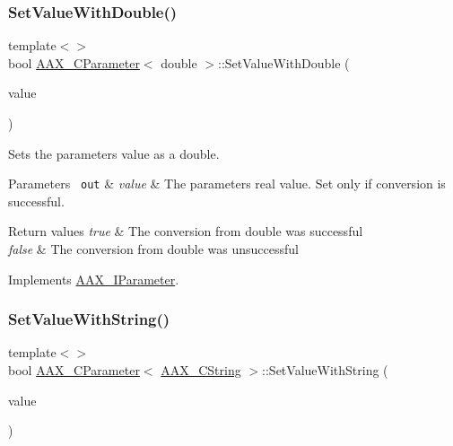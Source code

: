 \subsubsection{\texorpdfstring{SetValueWithDouble()}{SetValueWithDouble()}\hspace{0.1cm}{\footnotesize\ttfamily [2/2]}}
{\footnotesize\ttfamily template$<$$>$ \\
bool \mbox{\hyperlink{a01537}{A\+A\+X\+\_\+\+C\+Parameter}}$<$ double $>$\+::Set\+Value\+With\+Double (\begin{DoxyParamCaption}\item[{double}]{value }\end{DoxyParamCaption})\hspace{0.3cm}{\ttfamily [virtual]}}



Sets the parameter\textquotesingle{}s value as a double. 


\begin{DoxyParams}[1]{Parameters}
\mbox{\texttt{ out}}  & {\em value} & The parameter\textquotesingle{}s real value. Set only if conversion is successful.\\
\hline
\end{DoxyParams}

\begin{DoxyRetVals}{Return values}
{\em true} & The conversion from double was successful \\
\hline
{\em false} & The conversion from double was unsuccessful \\
\hline
\end{DoxyRetVals}


Implements \mbox{\hyperlink{a01857_a95e2d31931b586f43e42d41f2dce7c6d}{A\+A\+X\+\_\+\+I\+Parameter}}.

\mbox{\label{a01537_a73d6d6e280fb970dcc7d65682ace4f73}} 
\subsubsection{\texorpdfstring{SetValueWithString()}{SetValueWithString()}\hspace{0.1cm}{\footnotesize\ttfamily [2/2]}}
{\footnotesize\ttfamily template$<$$>$ \\
bool \mbox{\hyperlink{a01537}{A\+A\+X\+\_\+\+C\+Parameter}}$<$ \mbox{\hyperlink{a01573}{A\+A\+X\+\_\+\+C\+String}} $>$\+::Set\+Value\+With\+String (\begin{DoxyParamCaption}\item[{const \mbox{\hyperlink{a01873}{A\+A\+X\+\_\+\+I\+String}} \&}]{value }\end{DoxyParamCaption})\hspace{0.3cm}{\ttfamily [virtual]}}



